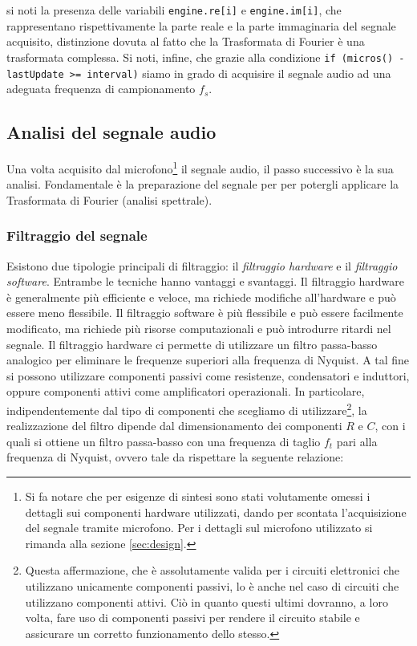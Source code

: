 \documentclass[a4paper,12pt]{report}  %
\newcommand{\lstinlinebg}[1]{\colorbox{backcolour}{\lstinline|#1|}}
\begin{document}
si noti la presenza delle variabili \lstinlinebg{engine.re[i]} e \lstinlinebg{engine.im[i]}, che rappresentano rispettivamente la parte reale e la parte immaginaria del segnale acquisito, distinzione dovuta al fatto che la Trasformata di Fourier è una trasformata complessa.
Si noti, infine, che grazie alla condizione \lstinlinebg{if (micros() - lastUpdate >= interval)} siamo in grado di acquisire il segnale audio ad una adeguata frequenza di campionamento $f_s$.

\subsection{Analisi del segnale audio}
Una volta acquisito dal microfono\footnote{Si fa notare che per esigenze di sintesi sono stati volutamente omessi i dettagli sui componenti hardware utilizzati, dando per scontata l'acquisizione del segnale tramite microfono. Per i dettagli sul microfono utilizzato si rimanda alla sezione \ref{sec:design}.} il segnale audio, il passo successivo è la sua analisi.
Fondamentale è la preparazione del segnale per per potergli applicare la Trasformata di Fourier (analisi spettrale).

\subsubsection{Filtraggio del segnale}\label{sec:filtering}
Esistono due tipologie principali di filtraggio: il \textit{filtraggio hardware} e il \textit{filtraggio software}.
Entrambe le tecniche hanno vantaggi e svantaggi.
Il filtraggio hardware è generalmente più efficiente e veloce, ma richiede modifiche all'hardware e può essere meno flessibile.
Il filtraggio software è più flessibile e può essere facilmente modificato, ma richiede più risorse computazionali e può introdurre ritardi nel segnale.
Il filtraggio hardware ci permette di utilizzare un filtro passa-basso analogico per eliminare le frequenze superiori alla frequenza di Nyquist.
A tal fine si possono utilizzare componenti passivi come resistenze, condensatori e induttori, oppure componenti attivi come amplificatori operazionali.
In particolare, indipendentemente dal tipo di componenti che scegliamo di utilizzare\footnote{Questa affermazione, che è assolutamente valida per i circuiti elettronici che utilizzano unicamente componenti passivi, lo è anche nel caso di circuiti che utilizzano componenti attivi. Ciò in quanto questi ultimi dovranno, a loro volta, fare uso di componenti passivi per rendere il circuito stabile e assicurare un corretto funzionamento dello stesso.}, la realizzazione del filtro dipende dal dimensionamento dei componenti $R$ e $C$, con i quali si ottiene un filtro passa-basso con una frequenza di taglio $f_t$ pari alla frequenza di Nyquist, ovvero tale da rispettare la seguente relazione:
\end{document}
